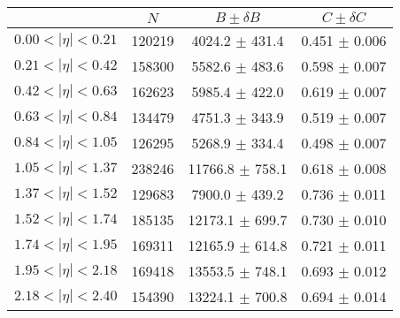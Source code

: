 \begin{tabular}{lccc}
\hline
    &   $N$   & $B \pm \delta B$  &  $C \pm \delta C$ \\
\hline
$0.00 < |\eta| <0.21$          & 120219     & 4024.2     $\pm$ 431.4 & 0.451      $\pm$ 0.006 \\
$0.21 < |\eta| <0.42$          & 158300     & 5582.6     $\pm$ 483.6 & 0.598      $\pm$ 0.007 \\
$0.42 < |\eta| <0.63$          & 162623     & 5985.4     $\pm$ 422.0 & 0.619      $\pm$ 0.007 \\
$0.63 < |\eta| <0.84$          & 134479     & 4751.3     $\pm$ 343.9 & 0.519      $\pm$ 0.007 \\
$0.84 < |\eta| <1.05$          & 126295     & 5268.9     $\pm$ 334.4 & 0.498      $\pm$ 0.007 \\
$1.05 < |\eta| <1.37$          & 238246     & 11766.8    $\pm$ 758.1 & 0.618      $\pm$ 0.008 \\
$1.37 < |\eta| <1.52$          & 129683     & 7900.0     $\pm$ 439.2 & 0.736      $\pm$ 0.011 \\
$1.52 < |\eta| <1.74$          & 185135     & 12173.1    $\pm$ 699.7 & 0.730      $\pm$ 0.010 \\
$1.74 < |\eta| <1.95$          & 169311     & 12165.9    $\pm$ 614.8 & 0.721      $\pm$ 0.011 \\
$1.95 < |\eta| <2.18$          & 169418     & 13553.5    $\pm$ 748.1 & 0.693      $\pm$ 0.012 \\
$2.18 < |\eta| <2.40$          & 154390     & 13224.1    $\pm$ 700.8 & 0.694      $\pm$ 0.014 \\
\hline
\end{tabular}
